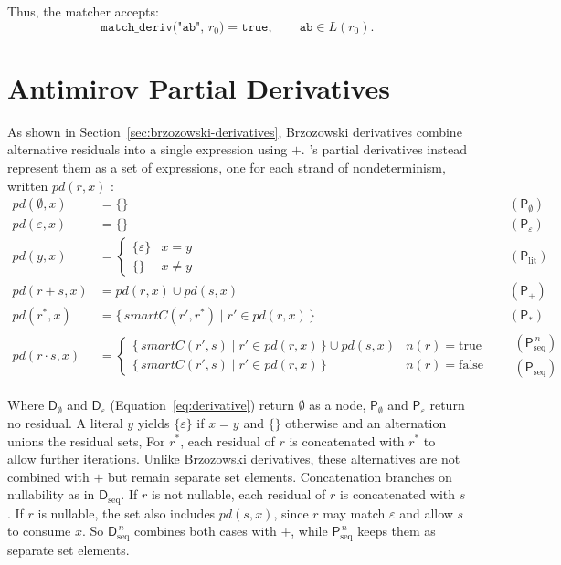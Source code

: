 Thus, the matcher accepts:
\[
\texttt{match\_deriv("ab", $r_0$)} = \texttt{true},
\qquad
\mathtt{ab} \in L(r_0).
\]

%
%
%
%
%

\section{Antimirov Partial Derivatives}
\label{sec:antimirov-partial-derivatives}

As shown in Section~\ref{sec:brzozowski-derivatives}, 
Brzozowski derivatives combine alternative residuals 
into a single expression using $+$. 
\citet{antimirov1996}'s partial derivatives instead represent them as a set of expressions, 
one for each strand of nondeterminism, written $pd(r,x)$ \citep[p.6]{sulzmann_slides}:
\begin{equation}\label{eq:pd}
\begin{aligned}
pd(\emptyset, x) &= \{\} &&(\mathsf{P}_{\emptyset}) \\
pd(\varepsilon, x) &= \{\} &&(\mathsf{P}_{\varepsilon}) \\
pd(y, x) &=
  \begin{cases} \{\varepsilon\} & x = y \\ \{\} & x \neq y \end{cases}
  &&(\mathsf{P}_{\mathrm{lit}}) \\
pd(r + s, x) &= pd(r,x) \cup pd(s,x) &&(\mathsf{P}_{+}) \\
pd(r^{*}, x) &= \{\, \mathit{smartC}(r', r^{*}) \mid r' \in pd(r,x) \,\}
  &&(\mathsf{P}_{*}) \\
pd(r \cdot s, x) &=
  \begin{cases}
    \{\, \mathit{smartC}(r', s) \mid r' \in pd(r,x) \,\} \cup pd(s,x)
      & n(r) = \mathrm{true} \\
    \{\, \mathit{smartC}(r', s) \mid r' \in pd(r,x) \,\}
      & n(r) = \mathrm{false}
  \end{cases}
  &&\begin{array}{l}
    (\mathsf{P}_{\mathrm{seq}}^{\,n}) \\
    (\mathsf{P}_{\mathrm{seq}})
  \end{array}
\end{aligned}
\end{equation}

Where $\mathsf{D}_{\emptyset}$ and $\mathsf{D}_{\varepsilon}$ 
(Equation~\eqref{eq:derivative}) return $\emptyset$ as a node, 
$\mathsf{P}_{\emptyset}$ and $\mathsf{P}_{\varepsilon}$ return no residual. 
A literal $y$ yields $\{\varepsilon\}$ if $x=y$ and $\{\}$ otherwise and
an alternation unions the residual sets, 
For $r^{*}$, each residual of $r$ is concatenated with $r^{*}$ 
to allow further iterations. 
Unlike Brzozowski derivatives, 
these alternatives are not combined with $+$ but remain separate set elements.
Concatenation branches on nullability as in $\mathsf{D}_{\mathrm{seq}}$. 
If $r$ is not nullable, each residual of $r$ is concatenated with $s$. 
If $r$ is nullable, the set also includes $pd(s,x)$, 
since $r$ may match $\varepsilon$ and allow $s$ to consume $x$.
So $\mathsf{D}_{\mathrm{seq}}^{\,n}$ combines both cases with $+$,
while $\mathsf{P}_{\mathrm{seq}}^{\,n}$ keeps them as separate set elements.

